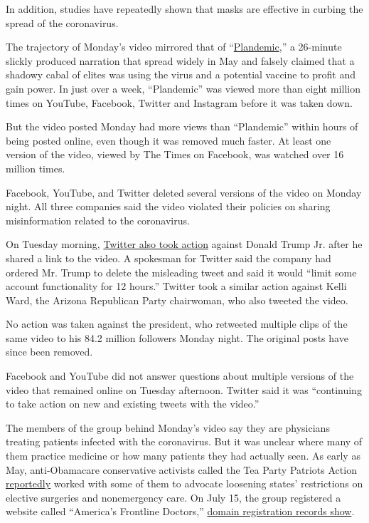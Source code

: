 In addition, studies have repeatedly shown that masks are effective in
curbing the spread of the coronavirus.

The trajectory of Monday's video mirrored that of
``\href{https://web.archive.org/web/20200728210031/https://www.nytimes.com/2020/05/20/technology/plandemic-movie-youtube-facebook-coronavirus.html}{Plandemic},''
a 26-minute slickly produced narration that spread widely in May and
falsely claimed that a shadowy cabal of elites was using the virus and a
potential vaccine to profit and gain power. In just over a week,
``Plandemic'' was viewed more than eight million times on YouTube,
Facebook, Twitter and Instagram before it was taken down.

But the video posted Monday had more views than ``Plandemic'' within
hours of being posted online, even though it was removed much faster. At
least one version of the video, viewed by The Times on Facebook, was
watched over 16 million times.

Facebook, YouTube, and Twitter deleted several versions of the video on
Monday night. All three companies said the video violated their policies
on sharing misinformation related to the coronavirus.

On Tuesday morning,
\href{https://web.archive.org/web/20200728210031/https://www.nytimes.com/live/2020/07/28/business/stock-market-today-coronavirus/twitter-limits-donald-trump-jrs-account-after-he-shares-virus-misinformation}{Twitter
also took action} against Donald Trump Jr. after he shared a link to the
video. A spokesman for Twitter said the company had ordered Mr. Trump to
delete the misleading tweet and said it would ``limit some account
functionality for 12 hours.'' Twitter took a similar action against
Kelli Ward, the Arizona Republican Party chairwoman, who also tweeted
the video.

No action was taken against the president, who retweeted multiple clips
of the same video to his 84.2 million followers Monday night. The
original posts have since been removed.

Facebook and YouTube did not answer questions about multiple versions of
the video that remained online on Tuesday afternoon. Twitter said it was
``continuing to take action on new and existing tweets with the video.''

The members of the group behind Monday's video say they are physicians
treating patients infected with the coronavirus. But it was unclear
where many of them practice medicine or how many patients they had
actually seen. As early as May, anti-Obamacare conservative activists
called the Tea Party Patriots Action
\href{https://web.archive.org/web/20200728210031/https://news.bloomberglaw.com/health-law-and-business/hospitals-doctors-get-conservatives-push-for-elective-care}{reportedly}
worked with some of them to advocate loosening states' restrictions on
elective surgeries and nonemergency care. On July 15, the group
registered a website called ``America's Frontline Doctors,''
\href{https://web.archive.org/web/20200728210031/https://whois.domaintools.com/americasfrontlinedoctors.com}{domain
registration records show}.

